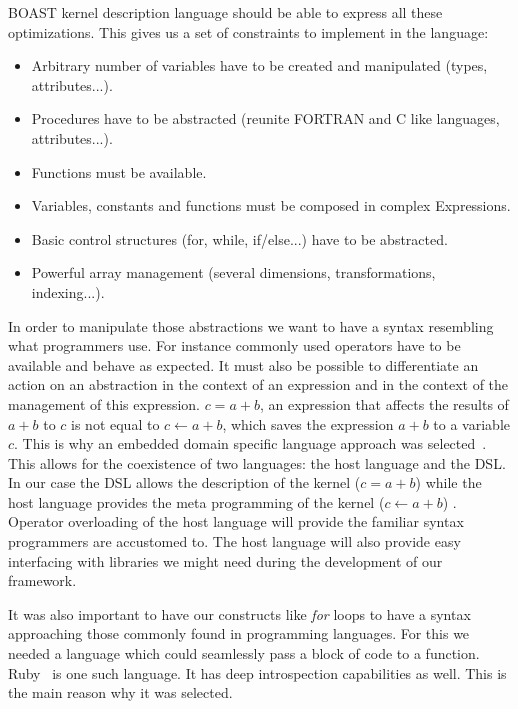 \documentclass[11pt, a4paper, twoside]{montblanc}
\begin{document}
BOAST kernel description language should be able to express all these
optimizations. This gives us a set of constraints to implement in the language:
\begin{itemize}
\item Arbitrary number of variables have to be created and manipulated (types,
attributes...).
\item Procedures have to be abstracted (reunite FORTRAN and C like languages,
attributes...).
\item Functions must be available.
\item Variables, constants and functions must be composed in complex
Expressions.
\item Basic control structures (for, while, if/else...) have to be abstracted.
\item Powerful array management (several dimensions, transformations,
indexing...).
\end{itemize}


In order to manipulate those abstractions we want to have a syntax resembling
what programmers use. For instance commonly used operators have to be available
and behave as expected. It must also be possible to differentiate an action on
an abstraction in the context of an expression and in the context of the
management of this expression. $c = a + b$, an expression that affects the
results of $a + b$ to $c$  is not equal to $c \leftarrow a + b$, which saves the
expression $a + b$ to a variable $c$. This is why an embedded domain specific
language approach was selected~\cite{hudak1996building}. This allows for the
coexistence of two languages: the host language and the DSL. In our case the DSL
allows the description of the kernel ($c = a + b$) while the host language
provides the meta programming of the kernel ($c \leftarrow a + b$)%
. Operator overloading of the host language will provide the familiar syntax
programmers are accustomed to. The host language will also provide easy
interfacing with libraries we might need during the development of our framework.

It was also important to have our constructs like \emph{for} loops to have a
syntax approaching those commonly found in programming languages. For this we
needed a language which could seamlessly pass a block of code to a function.
Ruby~\cite{matsumoto2002ruby} is one such language. It has deep introspection
capabilities as well. This is the main reason why it was selected.
\end{document}
